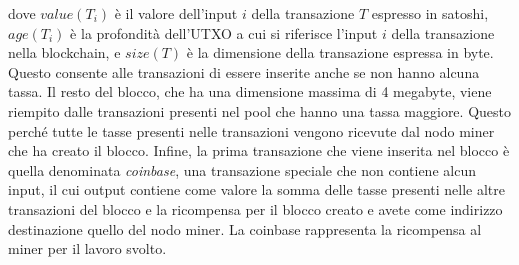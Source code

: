 dove $value(T_i)$ è il valore dell'input $i$ della transazione $T$ espresso in satoshi, $age(T_i)$ è la profondità dell'UTXO a cui si riferisce l'input $i$ della transazione nella blockchain, e $size(T)$ è la dimensione della transazione espressa in byte.
Questo consente alle transazioni di essere inserite anche se non hanno alcuna tassa.
Il resto del blocco, che ha una dimensione massima di 4 megabyte, viene riempito dalle transazioni presenti nel pool che hanno una tassa maggiore. Questo perché tutte le tasse presenti nelle transazioni vengono ricevute dal nodo miner che ha creato il blocco.
Infine, la prima transazione che viene inserita nel blocco è quella denominata \emph{coinbase}, una transazione speciale che non contiene alcun input, il cui output contiene come valore la somma delle tasse presenti nelle altre transazioni del blocco e la ricompensa per il blocco creato e avete come indirizzo destinazione quello del nodo miner. La coinbase rappresenta la ricompensa al miner per il lavoro svolto.

